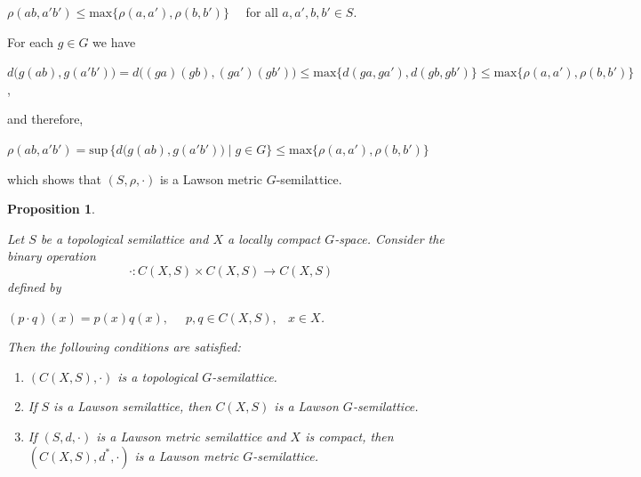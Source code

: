 \documentclass[12pt]{amsart}
\newtheorem{proposition}[theorem]{Proposition}
\theoremstyle{definition}
\begin{document}
	\begin{center}
		$\rho(a b,a' b')\leq\mbox{max}\{\rho(a,a'),\rho(b,b')\}\quad$ for all $a,a',b,b'\in S$.
	\end{center}
	
	For each $g\in G$ we have
	\begin{center}
		$d\big(g(ab),g(a'b')\big)=d\big((ga)(gb),(ga')(gb')\big)\leq \mbox{max}\{d(ga,ga'),d(gb,gb')\}\leq \mbox{max}\{\rho(a,a'),\rho(b,b')\}$,
	\end{center}
	and therefore, 
	\begin{center}
		$\rho(a b,a' b')=\text{sup}\,\{d\big(g(ab),g(a'b')\big)\mid g\in G\}\leq\mbox{max}\{\rho(a,a'),\rho(b,b')\}$ 
	\end{center}
	which shows that $(S,\rho,\cdot)$ is a Lawson metric $G$-semilattice.
	
	\begin{proposition}\label{FuncspacesLawonmetric}
		\rm{Let $S$ be a topological semilattice and $X$ a locally compact $G$-space. Consider the binary operation 
		$$\cdot: C(X,S)\times C(X,S)\rightarrow C(X,S)$$
		 defined by
			
			\begin{center}
				$(p\cdot q)(x)=p(x)q(x),\quad$ $p,q\in C(X,S),\ \ $ $x\in X$. 
			\end{center}
			
			Then the following conditions are satisfied:
			
			\begin{enumerate}
				\item [(i)] $(C(X,S),\cdot)$ is a topological $G$-semilattice.
				\item [(ii)] If $S$ is a Lawson semilattice, then $C(X,S)$ is a Lawson $G$-semilattice.
				\item [(iii)] If $(S,d,\cdot)$ is a Lawson metric semilattice and $X$ is compact, then $(C(X,S),d^*,\cdot)$ is a Lawson metric $G$-semilattice.
		\end{enumerate}}
	\end{proposition}
	
\end{document}
